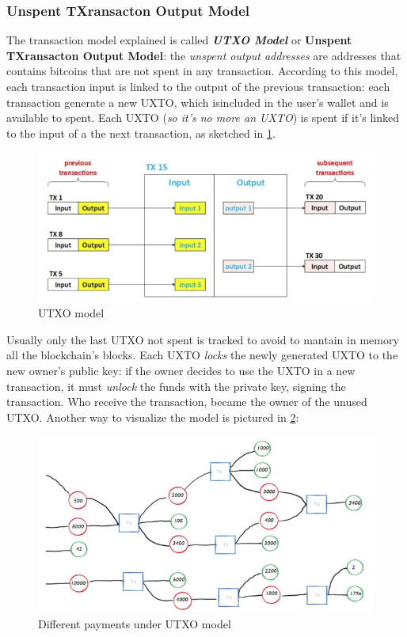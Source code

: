 \documentclass[10pt,a4paper]{report}
\begin{document}
\subsubsection{Unspent TXransacton Output Model}\label{sec:unspent-txransacton-output-model}
The transaction model explained is called \textit{\textbf{UTXO Model}} or \textbf{Unspent TXransacton Output Model}: the \textit{unspent output addresses} are addresses that contains bitcoins that are not spent in any transaction.
According to this model, each transaction input is linked to the output of the previous transaction: each transaction generate a new UXTO, which isincluded in the user's wallet and is available to spent.
Each UXTO (\textit{so it's no more an UXTO}) is spent if it's linked to the input of a the next transaction, as sketched in \ref{utxo-model}.
\begin{figure}[h]
	\centering
	\includegraphics[scale=0.60]{images/Pasted image 20230329121518.png}
	\caption{UTXO model}
	\label{utxo-model}
\end{figure}

Usually only the last UTXO not spent is tracked to avoid to mantain in memory all the blockchain's blocks.
Each UXTO \textit{locks} the newly generated UXTO to the new owner's public key: if the owner decides to use the UXTO in a new transaction, it must \textit{unlock} the funds with the private key, signing the transaction. Who receive the transaction, became the owner of the unused UTXO. Another way to visualize the model is pictured in \ref{utxo-graph}:
\begin{figure}[h]
	\centering
	\includegraphics[scale=0.50]{images/Pasted image 20230329122837.png}
	\caption{Different payments under UTXO model}
\label{utxo-graph}
\end{figure}
\end{document}
